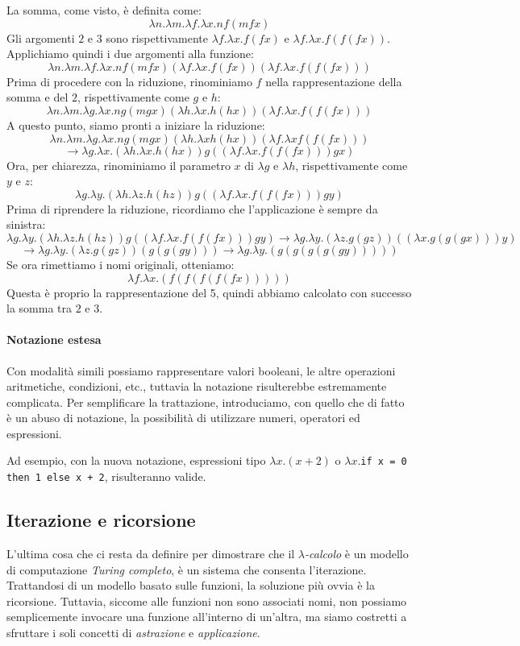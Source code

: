 \documentclass[12pt, a4paper]{report}
\theoremstyle{definition}
\newcommand{\code}[1]{\texttt{#1}}
\begin{document}
La somma, come visto, è definita come:
\[\lambda n.\lambda m.\lambda f.\lambda x.nf(mfx)\]
Gli argomenti $2$ e $3$ sono rispettivamente \(\lambda f.\lambda x.f(fx)\) e
\(\lambda f.\lambda x.f(f(fx))\). Applichiamo quindi i due argomenti alla funzione:
\[\lambda n.\lambda m.\lambda f.\lambda x.nf(mfx)(\lambda f.\lambda x.f(fx))
(\lambda f.\lambda x.f(f(fx)))\]
Prima di procedere con la riduzione, rinominiamo $f$ nella rappresentazione della
somma e del $2$, rispettivamente come $g$ e $h$:
\[\lambda n.\lambda m.\lambda g.\lambda x.ng(mgx)(\lambda h.\lambda x.h(hx))
(\lambda f.\lambda x.f(f(fx)))\]
A questo punto, siamo pronti a iniziare la riduzione:
\[\lambda n.\lambda m.\lambda g.\lambda x.ng(mgx)(\lambda h.\lambda xh(hx))
(\lambda f.\lambda xf(f(fx)))\]
\[\to\lambda g.\lambda x.(\lambda h.\lambda x.h(hx))g((\lambda f.\lambda x.f(f(fx)))gx)\]
Ora, per chiarezza, rinominiamo il parametro $x$ di $\lambda g$ e
$\lambda h$, rispettivamente come $y$ e $z$:
\[\lambda g.\lambda y.(\lambda h.\lambda z.h(hz))g((\lambda f.\lambda x.f(f(fx)))gy)\]
Prima di riprendere la riduzione, ricordiamo che l'applicazione è sempre da
sinistra:
\[\lambda g.\lambda y.(\lambda h.\lambda z.h(hz))g((\lambda f.\lambda x.f(f(fx)))gy)
\to\lambda g.\lambda y.(\lambda z.g(gz))((\lambda x.g(g(gx)))y)\]
\[\to\lambda g.\lambda y.(\lambda z.g(gz))(g(g(gy)))\to
\lambda g.\lambda y.(g(g(g(g(gy)))))\]
Se ora rimettiamo i nomi originali, otteniamo:
\[\lambda f.\lambda x.(f(f(f(f(fx)))))\]
Questa è proprio la rappresentazione del 5, quindi abbiamo calcolato con successo
la somma tra $2$ e $3$.

\paragraph*{Notazione estesa}
Con modalità simili possiamo rappresentare valori booleani, le altre operazioni
aritmetiche, condizioni, etc., tuttavia la notazione risulterebbe estremamente
complicata. Per semplificare la trattazione, introduciamo, con quello che di
fatto è un abuso di notazione, la possibilità di utilizzare numeri, operatori ed
espressioni.

Ad esempio, con la nuova notazione, espressioni tipo \(\lambda x.(x+2)\) o
\code{$\lambda x.$if x = 0 then 1 else x + 2}, risulteranno valide.

\subsection{Iterazione e ricorsione}
L'ultima cosa che ci resta da definire per dimostrare che il \emph{$\lambda$-calcolo}
è un modello di computazione \emph{Turing completo}, è un sistema che consenta
l'iterazione. Trattandosi di un modello basato sulle funzioni, la soluzione più
ovvia è la ricorsione. Tuttavia, siccome alle funzioni non sono associati nomi,
non possiamo semplicemente invocare una funzione all'interno di un'altra, ma
siamo costretti a sfruttare i soli concetti di \emph{astrazione} e \emph{applicazione}.
\end{document}

